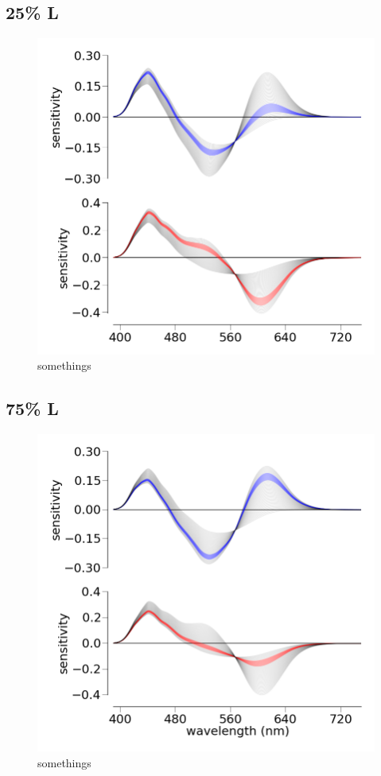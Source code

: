 \subsection{25\% L}

\begin{figure}[htbp]
\centering
\includegraphics{../presentations/static/figures/colorModel/familyLMS_25L.png}
\caption{somethings}
\end{figure}

\subsection{75\% L}

\begin{figure}[htbp]
\centering
\includegraphics{../presentations/static/figures/colorModel/familyLMS_75L.png}
\caption{somethings}
\end{figure}

